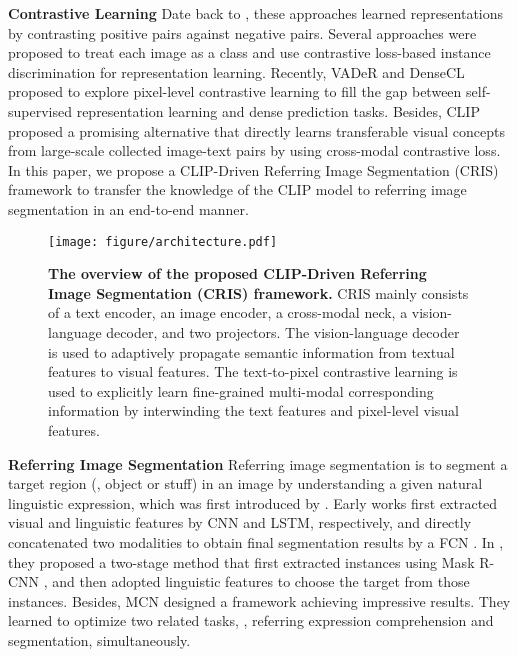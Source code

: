\documentclass[10pt,twocolumn,letterpaper]{article}
\newcommand{\myparagraph}[1]{{\noindent\bf #1}}
\begin{document}
\myparagraph{Contrastive Learning}
Date back to \cite{hadsell2006dimensionality}, these approaches learned representations by contrasting positive pairs against negative pairs.
Several approaches \cite{he2020momentum,chen2020improved,chen2020simple,wu2018unsupervised,li2022selective} were proposed to treat each image as a class and use contrastive loss-based instance discrimination for representation learning.
Recently, VADeR and DenseCL \cite{wang2020DenseCL,pinheiro2020unsupervised} proposed to explore pixel-level contrastive learning to fill the gap between self-supervised representation learning and dense prediction tasks.
Besides, CLIP \cite{radford2021learning} proposed a promising alternative that directly learns transferable visual concepts from large-scale collected image-text pairs by using cross-modal contrastive loss.
In this paper, we propose a CLIP-Driven Referring Image Segmentation (CRIS) framework to transfer the knowledge of the CLIP model to referring image segmentation in an end-to-end manner.

\begin{figure*}[htbp]
    \begin{center}
        \texttt{[image: figure/architecture.pdf]}
\caption{\textbf{The overview of the proposed CLIP-Driven Referring Image Segmentation (CRIS) framework.}
                 CRIS mainly consists of a text encoder, an image encoder, a cross-modal neck, a vision-language decoder, and two projectors.
                 The vision-language decoder is used to adaptively propagate semantic information from textual features to visual features.
                 The text-to-pixel contrastive learning is used to explicitly learn fine-grained multi-modal corresponding information by interwinding the text features and pixel-level visual features.}
    \label{fig:method}
    \end{center}
    \vspace{-7mm}
\end{figure*}

\myparagraph{Referring Image Segmentation}
Referring image segmentation is to segment a target region (\eg, object or stuff) in an image by understanding a given natural linguistic expression, which was first introduced by \cite{hu2016segmentation}.
Early works \cite{liu2017recurrent,li2018referring,margffoy2018dynamic} first extracted visual and linguistic features by CNN and LSTM, respectively, and directly concatenated two modalities to obtain final segmentation results by a FCN \cite{long2015fully}.
In \cite{yu2018mattnet}, they proposed a two-stage method that first extracted instances using Mask R-CNN \cite{he2017mask}, and then adopted linguistic features to choose the target from those instances.
Besides, MCN \cite{luo2020multi} designed a framework achieving impressive results.
They learned to optimize two related tasks, \ie, referring expression comprehension and segmentation, simultaneously.
\end{document}
